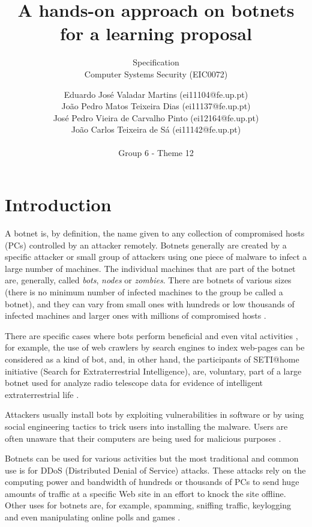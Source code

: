 \documentclass[]{article}
\title{A hands-on approach on botnets for a learning proposal\\}
\subtitle{Specification\\\vspace{10px}
	Computer Systems Security (EIC0072)
}
\author{Eduardo José Valadar Martins (ei11104@fe.up.pt)\\
	João Pedro Matos Teixeira Dias (ei11137@fe.up.pt)\\
	José Pedro Vieira de Carvalho Pinto (ei12164@fe.up.pt)\\
	João Carlos Teixeira de Sá (ei11142@fe.up.pt)\\\\Group 6 - Theme 12\\
}
\begin{document}
\maketitle
\thispagestyle{empty}
\newpage

\tableofcontents
\newpage
\section{Introduction}

A botnet is, by definition, the name given to any collection of compromised hosts (PCs) controlled by an attacker remotely. Botnets generally are created by a specific attacker or small group of attackers using one piece of malware to infect a large number of machines. The individual machines that are part of the botnet are, generally, called \textit{bots}, \textit{nodes} or \textit{zombies}. There are botnets of various sizes (there is no minimum number of infected machines to the group be called a botnet), and they can vary from small ones with hundreds or low thousands of infected machines and larger ones with millions of compromised hosts \cite{website:botnet-def}.

There are specific cases where bots perform beneficial and even vital activities \cite{website:botnet-useful}, for example, the use of web crawlers by search engines to index web-pages can be considered as a kind of bot, and, in other hand, the participants of SETI@home initiative (Search for Extraterrestrial Intelligence), are, voluntary, part of a large botnet used for analyze radio telescope data for evidence of intelligent extraterrestrial life \cite{website:setihome}.

Attackers usually install bots by exploiting vulnerabilities in software or by using social engineering tactics to trick users into installing the malware. Users are often unaware that their computers are being used for malicious purposes \cite{website:botnet-useful}.

Botnets can be used for various activities but the most traditional and common use is for DDoS (Distributed Denial of Service) attacks. These attacks rely on the computing power and bandwidth of hundreds or thousands of PCs to send huge amounts of traffic at a specific Web site in an effort to knock the site offline. Other uses for botnets are, for example, spamming, sniffing traffic, keylogging and even manipulating online polls and games \cite{article:honeypot-tracking}. 
\end{document}
